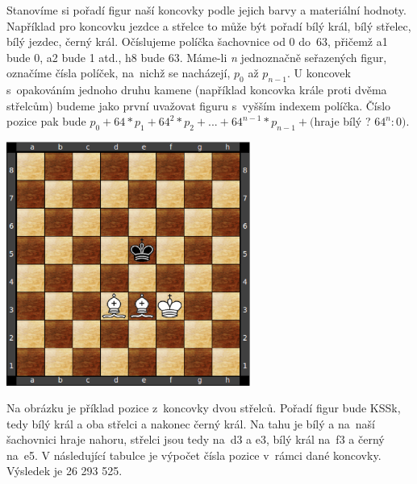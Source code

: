 \documentclass[11pt, titlepage]{article}
\begin{document}
Stanovíme si pořadí figur naší koncovky podle jejich barvy a materiální hodnoty. Například pro koncovku jezdce a střelce to může být pořadí bílý král, bílý střelec, bílý jezdec, černý král. Očíslujeme políčka šachovnice od 0 do~63, přičemž a1 bude 0, a2 bude 1 atd., h8 bude 63. Máme-li {\it n} jednoznačně seřazených figur, označíme čísla políček, na~nichž se nacházejí, \begin{math}p_0\end{math} až \begin{math}p_{n-1}\end{math}. U koncovek s~opakováním jednoho druhu kamene (například koncovka krále proti dvěma střelcům) budeme jako první uvažovat figuru s~vyšším indexem políčka. Číslo pozice pak bude \begin{math}p_0 + 64 * p_1 + 64^2 * p_2 + ... + 64^{n-1} * p_{n-1} + (\end{math}hraje bílý ? \begin{math}64^n : 0)\end{math}.

\begin{center}
	\includegraphics[width=8cm, height=8cm]{diagram2.ps}
\end{center}

Na obrázku je příklad pozice z~koncovky dvou střelců. Pořadí figur bude KSSk, tedy bílý král a oba střelci a nakonec černý král. Na tahu je bílý a na~naší šachovnici hraje nahoru, střelci jsou tedy na~d3 a e3, bílý král na~f3 a černý na~e5. V následující tabulce je výpočet čísla pozice v~rámci dané koncovky. Výsledek je 26 293 525.
\end{document}
